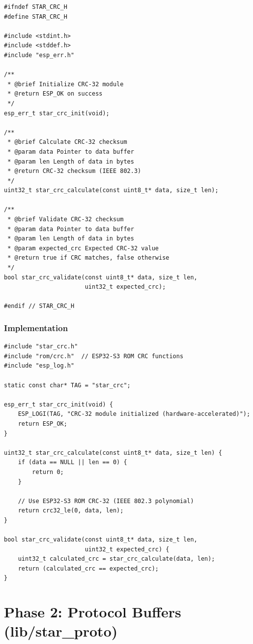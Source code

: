 \documentclass[12pt,letterpaper]{article}
\begin{document}
\begin{lstlisting}[caption={star\_crc.h - CRC-32 Interface}]
#ifndef STAR_CRC_H
#define STAR_CRC_H

#include <stdint.h>
#include <stddef.h>
#include "esp_err.h"

/**
 * @brief Initialize CRC-32 module
 * @return ESP_OK on success
 */
esp_err_t star_crc_init(void);

/**
 * @brief Calculate CRC-32 checksum
 * @param data Pointer to data buffer
 * @param len Length of data in bytes
 * @return CRC-32 checksum (IEEE 802.3)
 */
uint32_t star_crc_calculate(const uint8_t* data, size_t len);

/**
 * @brief Validate CRC-32 checksum
 * @param data Pointer to data buffer
 * @param len Length of data in bytes
 * @param expected_crc Expected CRC-32 value
 * @return true if CRC matches, false otherwise
 */
bool star_crc_validate(const uint8_t* data, size_t len,
                       uint32_t expected_crc);

#endif // STAR_CRC_H
\end{lstlisting}

\subsubsection{Implementation}

\begin{lstlisting}[caption={star\_crc.c - CRC-32 Implementation}]
#include "star_crc.h"
#include "rom/crc.h"  // ESP32-S3 ROM CRC functions
#include "esp_log.h"

static const char* TAG = "star_crc";

esp_err_t star_crc_init(void) {
    ESP_LOGI(TAG, "CRC-32 module initialized (hardware-accelerated)");
    return ESP_OK;
}

uint32_t star_crc_calculate(const uint8_t* data, size_t len) {
    if (data == NULL || len == 0) {
        return 0;
    }

    // Use ESP32-S3 ROM CRC-32 (IEEE 802.3 polynomial)
    return crc32_le(0, data, len);
}

bool star_crc_validate(const uint8_t* data, size_t len,
                       uint32_t expected_crc) {
    uint32_t calculated_crc = star_crc_calculate(data, len);
    return (calculated_crc == expected_crc);
}
\end{lstlisting}

\section{Phase 2: Protocol Buffers (lib/star\_proto)}
\end{document}
